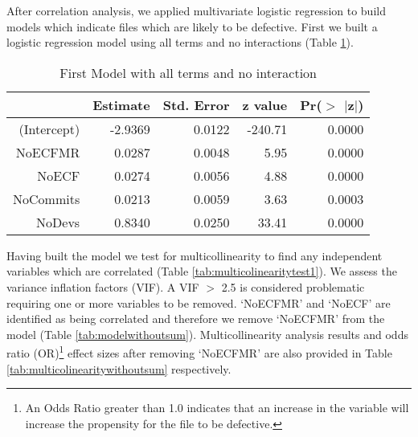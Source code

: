\documentclass[times]{smrauth}
\begin{document}


After correlation analysis, we applied multivariate logistic regression to build models which indicate files which are likely to be defective.
First we built a logistic regression model using all terms and no interactions (Table \ref{tab:modelwithallterms}).   


\begin{table}[tbp]
\centering
\caption{First Model with all terms and no interaction} 
\label{tab:modelwithallterms}
\begin{tabular}{rrrrr}
  \hline
 & Estimate & Std. Error & z value & Pr($>$ $|$z$|$) \\ 
  \hline
(Intercept) & -2.9369 & 0.0122 & -240.71 & 0.0000 \\ 
  NoECFMR & 0.0287 & 0.0048 & 5.95 & 0.0000 \\ 
  NoECF & 0.0274 & 0.0056 & 4.88 & 0.0000 \\ 
  NoCommits & 0.0213 & 0.0059 & 3.63 & 0.0003 \\ 
  NoDevs & 0.8340 & 0.0250 & 33.41 & 0.0000 \\ 
   \hline
\end{tabular}
\end{table}%

Having built the model we test for multicollinearity to find any independent variables which are correlated (Table \ref{tab:multicolinearitytest1}). We assess the variance inflation factors (VIF).  A VIF $>$ 2.5 is considered problematic requiring one or more variables to be removed. `NoECFMR' and `NoECF' are identified as being correlated and therefore we remove `NoECFMR' from the model (Table \ref{tab:modelwithoutsum}). 
Multicollinearity analysis results and odds ratio (OR)\footnote{An Odds Ratio greater than 1.0 indicates that an increase in the variable will increase the propensity for the file to be defective.} effect sizes after removing `NoECFMR' are also provided in Table \ref{tab:multicolinearitywithoutsum} respectively. 
\end{document}
